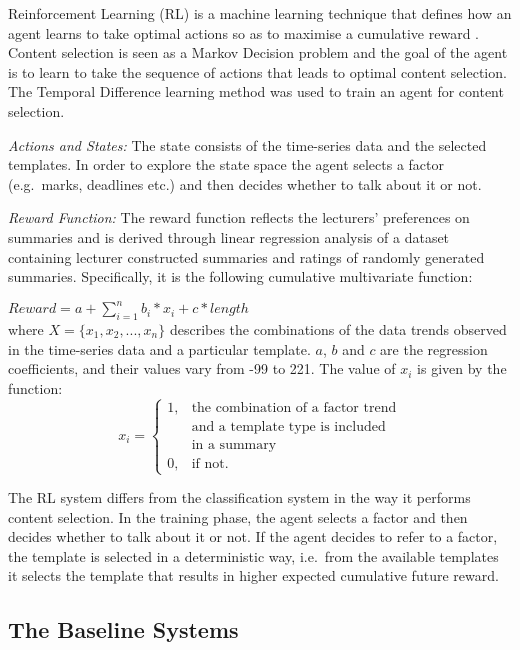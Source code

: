 \documentclass[11pt]{article}
\begin{document}
Reinforcement Learning (RL) is a machine learning technique that 
defines how an agent learns
to take optimal actions so as to maximise a cumulative reward
\cite{Sutton1998}. 
Content selection is seen as a Markov Decision problem and the goal of the agent is to learn to take
 the sequence of actions that leads to optimal content selection. The Temporal Difference learning method
 was used to train an agent for content selection.

\textit{Actions and States:} The state consists of the time-series data and the selected templates. In order to explore 
the state space the agent selects a factor (e.g.\
marks, deadlines etc.) and then decides whether to talk about it  or not. 

\textit{Reward Function:} The reward function reflects the lecturers'
preferences on summaries %
and is derived through linear regression analysis
of a dataset containing lecturer constructed summaries and ratings of randomly generated summaries. 
Specifically, it is the following cumulative multivariate function:

$Reward = a + \displaystyle\sum_{i=1}^{n} b_i*x_i + c*length $ \\ 
where $X = \{x_1, x_2, ..., x_n\}$ describes the combinations of the data trends observed in the time-series data 
and a particular template. $a$, $b$ and $c$ are the regression coefficients, and their 
values vary from -99 to 221. The value of $x_i$ is given by the function: 
\[
 x_i =
  \begin{cases}
  1, & \text{the combination of a factor trend}  \\
	& \text{and a template type is included}\\
      & \text{in a summary}\\
  0, & \text{if not.}  
  \end{cases}
\]

The RL system differs from the classification system in the way it performs content selection. 
In the training phase, the agent selects a factor and then decides whether 
to talk
about it or not. If the agent decides to refer to a factor, the template is selected
in a deterministic way, i.e.\ from the available templates 
it selects the template that results in higher expected cumulative future reward. 

\subsection{The Baseline Systems} \label{baselines}
\end{document}
